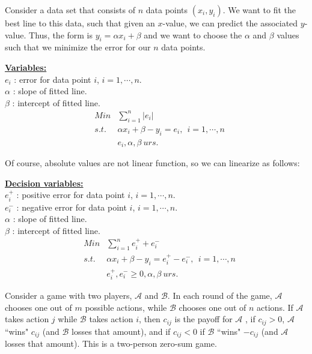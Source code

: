 \newpage {} Consider a data set that consists of $n$ data points $(x_i,y_i)$.  We want to fit the best line to this data, such that given an $x$-value, we can predict the associated $y$-value.  Thus, the form is $y_ i = \alpha x_i + \beta$ and we want to choose the $\alpha$ and $\beta$ values such that we minimize the error for our $n$ data points.

\smallskip  \underline{\bf Variables:}\\
$e_i$ : error for data point $i$, $i = 1,\cdots,n$. \\
$\alpha$ : slope of fitted line. \\
$\beta$ : intercept of fitted line.
\begin{eqnarray}
& Min   & \sum_{i=1}^n |e_i|  \nonumber \\
& s.t.  & \alpha x_i + \beta - y_i = e_i,~~ i=1,\cdots,n \nonumber \\
&       & e_i, \alpha, \beta ~ urs \nonumber.
\end{eqnarray}

Of course, absolute values are not linear function, so we can linearize as follows:

\smallskip  \underline{\bf Decision variables:}\\
$e_i^+$ : positive error for data point $i$, $i = 1,\cdots,n$. \\
$e_i^-$ : negative error for data point $i$, $i = 1,\cdots,n$. \\
$\alpha$ : slope of fitted line. \\
$\beta$ : intercept of fitted line.
\begin{eqnarray}
& Min   & \sum_{i=1}^n e_i^+ +e_i^- \nonumber \\
& s.t.  & \alpha x_i + \beta - y_i = e_i^+-e_i^-,~~ i=1,\cdots,n \nonumber \\
&       & e_i^+, e_i^- \ge 0, \alpha, \beta ~ urs \nonumber.
\end{eqnarray}
 
 Consider a game with two players, $\mathcal{A}$ and $\mathcal{B}$. In each round of the game, $\mathcal{A}$ chooses one out of $m$ possible actions, while $\mathcal{B}$ chooses one out of $n$ actions.  If $\mathcal{A}$ takes action $j$ while $\mathcal{B}$ takes action $i$, then $c_{ij}$ is the payoff for $\mathcal{A}$ , if $c_{ij} > 0$, $\mathcal{A}$ ``wins" $c_{ij}$ (and $\mathcal{B}$ losses that amount), and if $c_{ij} < 0$ if $\mathcal{B}$ ``wins" $-c_{ij}$ (and $\mathcal{A}$ losses that amount).  This is a two-person zero-sum game.

